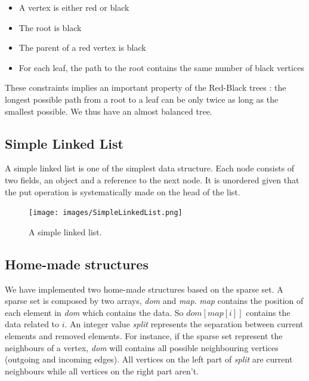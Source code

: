 \begin{itemize}
\item A vertex is either red or black
\item The root is black
\item The parent of a red vertex is black
\item For each leaf, the path to the root contains the same number of black vertices
\end{itemize}

These constraints implies an important property of the Red-Black trees : the longest possible path from a root to a leaf can be only twice as long as the smallest possible. We thus have an almost balanced tree.

\subsection{Simple Linked List}
A simple linked list is one of the simplest data structure. Each node consists of two fields, an object and a reference to the next node. It is unordered given that the put operation is systematically made on the head of the list.

\begin{figure}[!h]
\texttt{[image: images/SimpleLinkedList.png]}
\caption{A simple linked list.}
\end{figure}


\subsection{Home-made structures}
We have implemented two home-made structures based on the sparse set. 
A sparse set is composed by two arrays, \textit{dom} and \textit{map}. \textit{map} contains the position of each element in \textit{dom} which contains the data. So $dom[map[i]]$ contains the data related to $i$. An integer value \textit{split} represents the separation between current elements and removed elements. For instance, if the sparse set represent the neighbours of a vertex, \textit{dom} will contains all possible neighbouring vertices (outgoing and incoming edges). All vertices on the left part of \textit{split} are current neighbours while all vertices on the right part aren't. \newline

